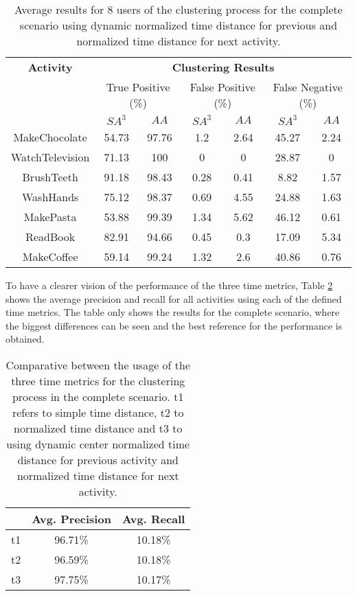 \begin{table}[htbp]\scriptsize
  \begin{center}
        \begin{tabular}{ccccccc}
            \hline            
            \textbf{Activity} & \multicolumn{6}{c}{\textbf{Clustering Results}} \\
             & \multicolumn{2}{c}{True Positive (\%)} & \multicolumn{2}{c}{False Positive (\%)} & \multicolumn{2}{c}{False Negative (\%)} \\
             & $SA^3$ & $AA$ & $SA^3$ & $AA$ & $SA^3$ & $AA$ \\
            \hline
            MakeChocolate   & 54.73 & 97.76 & 1.2  & 2.64 & 45.27 & 2.24 \\
	    WatchTelevision & 71.13 & 100   & 0    & 0    & 28.87 & 0    \\
	    BrushTeeth      & 91.18 & 98.43 & 0.28 & 0.41 & 8.82  & 1.57 \\
	    WashHands       & 75.12 & 98.37 & 0.69 & 4.55 & 24.88 & 1.63 \\
	    MakePasta       & 53.88 & 99.39 & 1.34 & 5.62 & 46.12 & 0.61 \\
	    ReadBook        & 82.91 & 94.66 & 0.45 & 0.3  & 17.09 & 5.34 \\
	    MakeCoffee      & 59.14 & 99.24 & 1.32 & 2.6  & 40.86 & 0.76 \\
            \hline
        \end{tabular}
        \caption{Average results for 8 users of the clustering process for the complete scenario using dynamic normalized time distance for previous and normalized time distance for next activity.}
        \label{tab-r-comp-t2}
   \end{center}
\end{table}

To have a clearer vision of the performance of the three time metrics, Table \ref{tab-r-comparative} shows the average precision and recall for all activities using each of the defined time metrics. The table only shows the results for the complete scenario, where the biggest differences can be seen and the best reference for the performance is obtained. 

\begin{table}[htbp]\scriptsize
\begin{center}
 \begin{tabular}{ccc}
  \hline
   & Avg. Precision & Avg. Recall \\
  \hline
  t1 & 96.71\% & 10.18\% \\
  t2 & 96.59\% & 10.18\% \\
  t3 & 97.75\% & 10.17\% \\
  \hline
 \end{tabular}
 \caption{Comparative between the usage of the three time metrics for the clustering process in the complete scenario. t1 refers to simple time distance, t2 to normalized time distance and t3 to using dynamic center normalized time distance for previous activity and normalized time distance for next activity.}
 \label{tab-r-comparative}
\end{center} 
\end{table}

